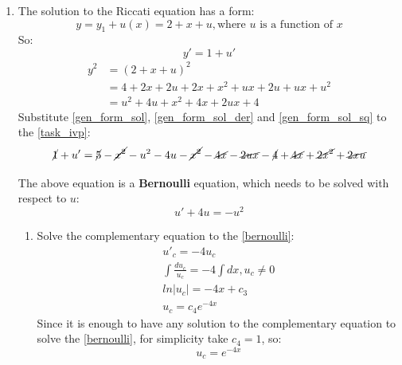 \documentclass[12pt,a4paper,titlepage]{article}
\begin{document}
\begin{enumerate}
    \item The solution to the Riccati equation has a form:
    \begin{equation} \label{gen_form_sol}
      y = y_1 + u(x) = 2 + x + u, \text{where $u$ is a function of $x$}
    \end{equation}
    So:
    \begin{equation} \label{gen_form_sol_der}
      y' = 1 + u'
    \end{equation}
    \begin{align}
      y^2 &= (2 + x + u)^2 \nonumber \\
      &= 4 + 2x + 2u + 2x + x^2 + ux + 2u + ux + u^2 \nonumber \\
      &= u^2 + 4u + x^2 + 4x + 2ux + 4 \label{gen_form_sol_sq}
    \end{align}
    Substitute \eqref{gen_form_sol}, \eqref{gen_form_sol_der} and \eqref{gen_form_sol_sq} to the \eqref{task_ivp}:
    \begin{equation*}
      \cancel{1} + u' = \cancel{5} - \cancel{x^2} - u^2 - 4u - \cancel{x^2} - \cancel{4x} - \cancel{2ux} - \cancel{4} + \cancel{4x} + \cancel{2x^2} + \cancel{2xu}
    \end{equation*}

    The above equation is a \textbf{Bernoulli} equation, which needs to be solved with respect to $u$:
    \begin{equation} \label{bernoulli}
      u' + 4u = -u^2
    \end{equation}
    \begin{enumerate}
      \item Solve the complementary equation to the \eqref{bernoulli}:
      \begin{gather*}
        u'_c = -4u_c\\
        \int \frac{du_c}{u_c} = -4 \int dx, u_c \neq 0\\
        ln|u_c| = -4x + c_3\\
        u_c = c_4e^{-4x}
      \end{gather*}
      Since it is enough to have any solution to the complementary equation to solve the \eqref{bernoulli}, for simplicity take $c_4 = 1$, so:
      \begin{equation} \label{bernoulli_comp_sol}
        u_c = e^{-4x}
      \end{equation}


\end{enumerate}
\end{enumerate}
\end{document}

